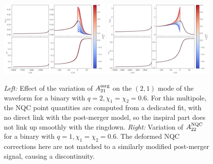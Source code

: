 \documentclass[prd,amssymb,amsmath,amsfonts,nofootinbib,reprint,showpacs,longbibliography]{revtex4-1}
\newcommand{\amrg}[1]{{A_{#1}^{\rm mrg}}}
\newcommand{\anqc}[1]{{A_{#1}^{\rm NQC}}}
\begin{document}
\begin{figure}
    \includegraphics[width=0.49\textwidth]{figs/delta_A21_mrg_-0.8_1.0.png}
    \includegraphics[width=0.49\textwidth]{figs/delta_A22_nqc_-0.8_1.0.png}
    \caption{\textit{Left:} Effect of the variation of $\amrg{21}$ on the $(2,1)$ mode of the waveform
    for a binary with $q = 2, \chi_1 = \chi_2 = 0.6$.
    For this multipole, the NQC point quantities are computed from a dedicated fit, with no direct link
    with the post-merger model, so the inspiral part does not link up smoothly with the ringdown.
    \textit{Right:} Variation of $\anqc{22}$ for a binary with $q = 1, \chi_1 = \chi_2 = 0.6$. The
    deformed NQC corrections here are not matched to a similarly modified post-merger signal, causing a discontinuity.}
\end{figure}


\end{document}
